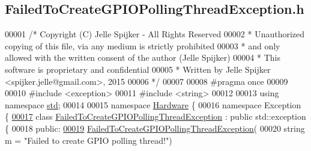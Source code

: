 \hypertarget{_failed_to_create_g_p_i_o_polling_thread_exception_8h_source}{}\subsection{Failed\+To\+Create\+G\+P\+I\+O\+Polling\+Thread\+Exception.\+h}
\label{_failed_to_create_g_p_i_o_polling_thread_exception_8h_source}

\begin{DoxyCode}
00001 \textcolor{comment}{/* Copyright (C) Jelle Spijker - All Rights Reserved}
00002 \textcolor{comment}{ * Unauthorized copying of this file, via any medium is strictly prohibited}
00003 \textcolor{comment}{ * and only allowed with the written consent of the author (Jelle Spijker)}
00004 \textcolor{comment}{ * This software is proprietary and confidential}
00005 \textcolor{comment}{ * Written by Jelle Spijker <spijker.jelle@gmail.com>, 2015}
00006 \textcolor{comment}{ */}
00007 
00008 \textcolor{preprocessor}{#pragma once}
00009 
00010 \textcolor{preprocessor}{#include <exception>}
00011 \textcolor{preprocessor}{#include <string>}
00012 
00013 \textcolor{keyword}{using namespace }\hyperlink{namespacestd}{std};
00014 
00015 \textcolor{keyword}{namespace }\hyperlink{namespace_hardware}{Hardware} \{
00016 \textcolor{keyword}{namespace }Exception \{
\hypertarget{_failed_to_create_g_p_i_o_polling_thread_exception_8h_source_l00017}{}\hyperlink{class_hardware_1_1_exception_1_1_failed_to_create_g_p_i_o_polling_thread_exception}{00017} \textcolor{keyword}{class }\hyperlink{class_hardware_1_1_exception_1_1_failed_to_create_g_p_i_o_polling_thread_exception}{FailedToCreateGPIOPollingThreadException} : \textcolor{keyword}{public} 
      std::exception \{
00018 \textcolor{keyword}{public}:
\hypertarget{_failed_to_create_g_p_i_o_polling_thread_exception_8h_source_l00019}{}\hyperlink{class_hardware_1_1_exception_1_1_failed_to_create_g_p_i_o_polling_thread_exception_a5505ab7e6613c84c9398bff4e2147510}{00019}   \hyperlink{class_hardware_1_1_exception_1_1_failed_to_create_g_p_i_o_polling_thread_exception_a5505ab7e6613c84c9398bff4e2147510}{FailedToCreateGPIOPollingThreadException}(
00020       \textcolor{keywordtype}{string} m = \textcolor{stringliteral}{"Failed to create GPIO polling thread!"})

\end{DoxyCode}
